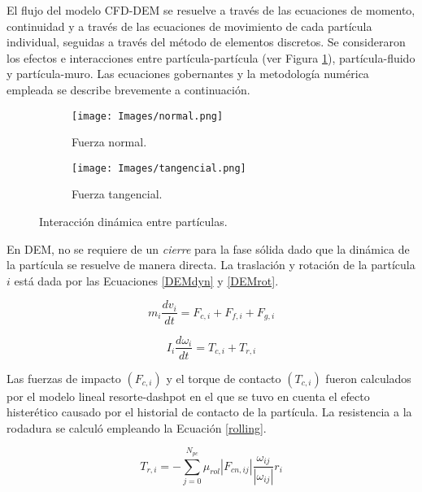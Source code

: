 \noindent
\justify

El flujo del modelo CFD-DEM se resuelve a trav\'es de las ecuaciones de momento, continuidad y a trav\'es de las ecuaciones de movimiento de cada part\'icula individual, seguidas a trav\'es del m\'etodo de elementos discretos. Se consideraron los efectos e interacciones entre part\'icula-part\'icula (ver Figura \ref{particula}), part\'icula-fluido y part\'icula-muro. Las ecuaciones gobernantes y la metodolog\'ia num\'erica empleada se describe brevemente a continuaci\'on.

\begin{figure}[h!]
	\centering
	\begin{subfigure}[b]{0.4\textwidth}
		\texttt{[image: Images/normal.png]}
		\caption{Fuerza normal.}
	\end{subfigure}
	\hfill
	\begin{subfigure}[b]{0.4\textwidth}
		\texttt{[image: Images/tangencial.png]}
		\caption{Fuerza tangencial.}
	\end{subfigure}
	\caption{Interacci\'on din\'amica entre part\'iculas.}
	\label{particula}
\end{figure}

\noindent
\justify

En DEM, no se requiere de un \textit{cierre} para la fase s\'olida dado que la din\'amica de la part\'icula se resuelve de manera directa. La traslaci\'on y rotaci\'on de la part\'icula $i$ est\'a dada por las Ecuaciones \ref{DEMdyn} y \ref{DEMrot}.

\begin{equation}
	m_i \frac{d v _i}{dt} = F_{c,i} + F_{f,i} + F_{g,i}
	\label{DEMdyn}
\end{equation}

\begin{equation}
	I_i \frac{d \omega _i}{dt} = T_{c,i} + T_{r,i}
	\label{DEMrot}
\end{equation}

\noindent
\justify

Las fuerzas de impacto $\left( F_{c,i} \right)$ y el torque de contacto $\left( T_{c,i} \right)$ fueron calculados por el modelo lineal resorte-dashpot en el que se tuvo en cuenta el efecto hister\'etico causado por el historial de contacto de la part\'icula. La resistencia a la rodadura se calcul\'o empleando la Ecuaci\'on \ref{rolling}.

\begin{equation}
	T_{r,i} = - \sum _{j=0} ^{N_{pc}} \mu _{rol}  \left|F_{cn, ij} \right| \frac{\omega _{ij}}{\left| \omega _{ij} \right|} r_i
	\label{rolling}
\end{equation}

